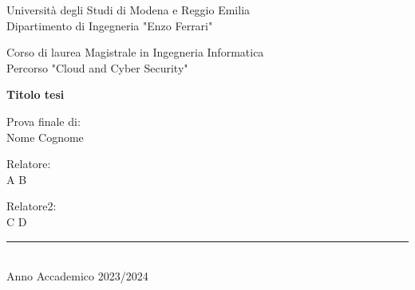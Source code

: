 \thispagestyle{plain}

\begin{titlepage}
    \begin{center}

		Università degli Studi di Modena e Reggio Emilia\\
		\large
		Dipartimento di Ingegneria "Enzo Ferrari"

        \vspace{2.5cm}
        
		\Large
		Corso di laurea Magistrale in Ingegneria Informatica\\
		
		\large
		Percorso "Cloud and Cyber Security"		
		
		\vspace{2.5cm}
        
        \Huge
        \textbf{Titolo tesi}

        \vspace{3cm}

		\large
		

		\begin{flushright}
		Prova finale di:\\
		Nome Cognome
		\end{flushright}		        
        
        
		\Large        
        \vspace{3cm}
        
        \begin{flushleft}
        Relatore:\\
        A B
        \end{flushleft}
                
        \begin{flushleft}
        Relatore2:\\
        C D
        \end{flushleft}
            
		\vfill
		
		\rule{300pt}{0.2pt}\\
		\small
		Anno Accademico 2023/2024
            
    \end{center}
\end{titlepage}